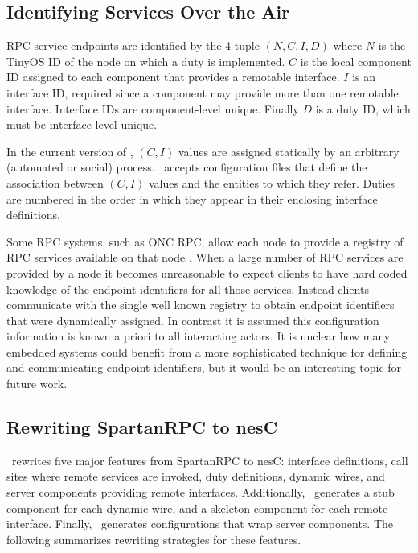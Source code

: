 \subsection{Identifying Services Over the Air}

RPC service endpoints are identified by the 4-tuple $(N, C, I, D)$ where $N$ is the TinyOS ID of
the node on which a duty is implemented. $C$ is the local component ID assigned to each
component that provides a remotable interface. $I$ is an interface ID, required since a
component may provide more than one remotable interface. Interface IDs are component-level
unique. Finally $D$ is a duty ID, which must be interface-level unique.

In the current version of \Sprocket, $(C, I)$ values are assigned statically by an arbitrary
(automated or social) process. \Sprocket\ accepts configuration files that define the
association between $(C, I)$ values and the entities to which they refer. Duties are numbered in
the order in which they appear in their enclosing interface definitions.

Some RPC systems, such as ONC RPC, allow each node to provide a registry of RPC services
available on that node \cite{RFC-1833}. When a large number of RPC services are provided by a
node it becomes unreasonable to expect clients to have hard coded knowledge of the endpoint
identifiers for all those services. Instead clients communicate with the single well known
registry to obtain endpoint identifiers that were dynamically assigned. In contrast it is assumed
this configuration information is known a priori to all interacting actors. It is unclear how
many embedded systems could benefit from a more sophisticated technique for defining and
communicating endpoint identifiers, but it would be an interesting topic for future work.

\subsection{Rewriting SpartanRPC to nesC}

\Sprocket\ rewrites five major features from SpartanRPC to nesC: interface definitions, call
sites where remote services are invoked, duty definitions, dynamic wires, and server components
providing remote interfaces. Additionally, \Sprocket\ generates a stub component for each
dynamic wire, and a skeleton component for each remote interface. Finally, \Sprocket\ generates
configurations that wrap server components. The following summarizes rewriting strategies for
these features.

